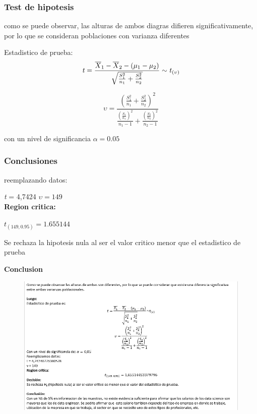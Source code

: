 \documentclass{beamer}
\begin{document}
\begin{frame}
  \frametitle{Test de hipotesis}

 como se puede observar, las alturas de ambos diagras difieren significativamente, por lo que se consideran poblaciones
  con varianza diferentes

  Estadistico de prueba:
  \[
    \textrm{\textit{t}} = \frac{\overline{X}_1 - \overline{X}_2 - (\mu_1 - \mu_2)}{\sqrt{\frac{{S_1^2}}{n_1} + \frac{{S_2^2}}{n_2}}}
    \sim \textrm{\textit{t}}_{(\upsilon)}
  \]

  \[
    \upsilon = \frac{(\frac{S_1^2}{n_1} + \frac{S_2^2}{n_2})^2}{\frac{(\frac{S_1}{n_1})^2}{n_1 - 1} + \frac{(\frac{S_2}{n_2})^2}{n_2 - 1}}
  \]


  con un nivel de significancia $\alpha = 0.05$

\end{frame}

\begin{frame}
\frametitle{Conclusiones}
reemplazando datos:

  \textit{t} = 4,7424
  \newline
  $\upsilon = 149$
  \\
  \textbf{Region critica: }

  $t_{(149, 0.95)} = 1.655144$

  Se rechaza la hipotesis nula al ser el valor critico menor que el estadistico de prueba

  \textbf{Conclusion}\\
\end{frame}

\begin{frame}
\begin{figure}[t]
    \includegraphics[width=12cm]{Screenshot_20221028_234650.png}
\end{figure}

\end{frame}
\end{document}

